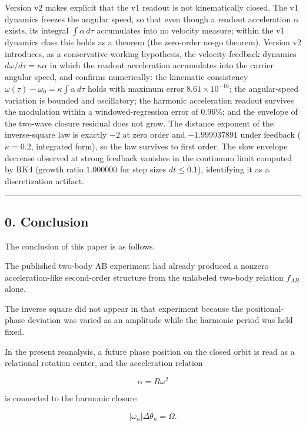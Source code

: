 \documentclass[
  a4paper,
]{article}
\begin{document}
Version v2 makes explicit that the v1 readout is not kinematically
closed. The v1 dynamics freezes the angular speed, so that even though a
readout acceleration \(\alpha\) exists, its integral
\(\int\alpha\,d\tau\) accumulates into no velocity measure; within the
v1 dynamics class this holds as a theorem (the zero-order no-go
theorem). Version v2 introduces, as a conservative working hypothesis,
the velocity-feedback dynamics \(d\omega/d\tau=\kappa\alpha\) in which
the readout acceleration accumulates into the carrier angular speed, and
confirms numerically: the kinematic consistency
\(\omega(\tau)-\omega_0=\kappa\int\alpha\,d\tau\) holds with maximum
error \(8.61\times10^{-16}\); the angular-speed variation is bounded and
oscillatory; the harmonic acceleration readout survives the modulation
within a windowed-regression error of \(0.96\%\); and the envelope of
the two-wave closure residual does not grow. The distance exponent of
the inverse-square law is exactly \(-2\) at zero order and
\(-1.999937891\) under feedback (\(\kappa=0.2\), integrated form), so
the law survives to first order. The slow envelope decrease observed at
strong feedback vanishes in the continuum limit computed by RK4 (growth
ratio \(1.000000\) for step sizes \(dt\le0.1\)), identifying it as a
discretization artifact.

\begin{center}\rule{0.5\linewidth}{0.5pt}\end{center}

\subsection{0. Conclusion}\label{conclusion}

The conclusion of this paper is as follows.

The published two-body AB experiment had already produced a nonzero
acceleration-like second-order structure from the unlabeled two-body
relation \(f_{AB}\) alone.

The inverse square did not appear in that experiment because the
positional-phase deviation was varied as an amplitude while the harmonic
period was held fixed.

In the present reanalysis, a future phase position on the closed orbit
is read as a relational rotation center, and the acceleration relation

\[
\alpha=R\omega^2
\]

is connected to the harmonic closure

\[
|\omega_n|\Delta\theta_n=\Omega.
\]
\end{document}
